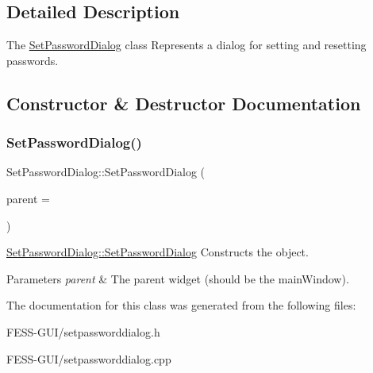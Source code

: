 \subsection{Detailed Description}
The \hyperlink{class_set_password_dialog}{Set\+Password\+Dialog} class Represents a dialog for setting and resetting passwords. 

\subsection{Constructor \& Destructor Documentation}
\hypertarget{class_set_password_dialog_a6c0f4e419cde5431401dd4deeccb1a54}{}\label{class_set_password_dialog_a6c0f4e419cde5431401dd4deeccb1a54} 
\subsubsection{\texorpdfstring{Set\+Password\+Dialog()}{SetPasswordDialog()}}
{\footnotesize\ttfamily Set\+Password\+Dialog\+::\+Set\+Password\+Dialog (\begin{DoxyParamCaption}\item[{Q\+Widget $\ast$}]{parent = {} }\end{DoxyParamCaption})\hspace{0.3cm}{\ttfamily [explicit]}}



\hyperlink{class_set_password_dialog_a6c0f4e419cde5431401dd4deeccb1a54}{Set\+Password\+Dialog\+::\+Set\+Password\+Dialog} Constructs the object. 


\begin{DoxyParams}{Parameters}
{\em parent} & The parent widget (should be the main\+Window). \\
\hline
\end{DoxyParams}


The documentation for this class was generated from the following files\+:\begin{DoxyCompactItemize}
\item 
F\+E\+S\+S-\/\+G\+U\+I/setpassworddialog.\+h\item 
F\+E\+S\+S-\/\+G\+U\+I/setpassworddialog.\+cpp\end{DoxyCompactItemize}
